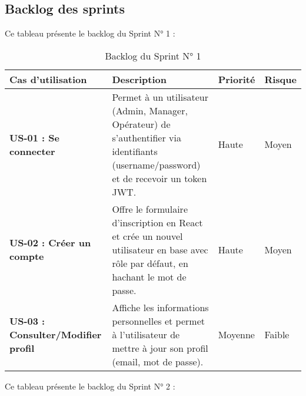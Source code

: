 \documentclass[12pt,a4paper]{report}
\renewcommand{\arraystretch}{1.5}
\begin{document}
\cleardoublepage

\subsection{Backlog des sprints}

Ce tableau présente le backlog du Sprint N° 1 :\\

\begin{table}[H]
  \centering
  \renewcommand{\arraystretch}{2}
  \begin{tabular}{|
      >{\bfseries\centering\arraybackslash}m{} %
      |>{\raggedright\arraybackslash}m{}       %
      |>{\centering\arraybackslash}m{}         %
      |>{\centering\arraybackslash}m{}         %
    |}
    \hline
    \rowcolor{lightblue!70}
    Cas d’utilisation & Description & Priorité & Risque \\
    \hline
    US-01 : Se connecter & Permet à un utilisateur (Admin, Manager, Opérateur) de s’authentifier via identifiants (username/password) et de recevoir un token JWT. & Haute & Moyen \\
    \hline
    US-02 : Créer un compte & Offre le formulaire d’inscription en React et crée un nouvel utilisateur en base avec rôle par défaut, en hachant le mot de passe. & Haute & Moyen \\
    \hline
    US-03 : Consulter/Modifier profil & Affiche les informations personnelles et permet à l’utilisateur de mettre à jour son profil (email, mot de passe). & Moyenne & Faible \\
    \hline
  \end{tabular}
  \caption{Backlog du Sprint N° 1}
  \label{tab:backlog_sprint1}
\end{table}

Ce tableau présente le backlog du Sprint N° 2 :\\
\end{document}
